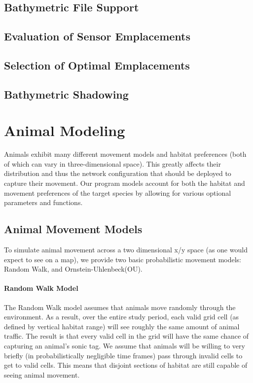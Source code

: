 \subsection{Bathymetric File Support}
\subsection{Evaluation of Sensor Emplacements}
\subsection{Selection of Optimal Emplacements}

\subsection{Bathymetric Shadowing}



\section{Animal Modeling}
Animals exhibit many different movement models and habitat preferences (both of which can vary in three-dimensional space).  This greatly affects their distribution and thus the network configuration that should be deployed to capture their movement.  Our program models account for both the habitat and movement preferences of the target species by allowing for various optional parameters and functions.

\subsection{Animal Movement Models}
 To simulate animal movement across a two dimensional x/y space (as one would expect to see on a map), we provide two basic probabilistic movement models: Random Walk, and Ornstein-Uhlenbeck(OU).  

\paragraph{Random Walk Model}
The Random Walk model assumes that animals move randomly through the environment.  As a result, over the entire study period, each valid grid cell (as defined by vertical habitat range) will see roughly the same amount of animal traffic.  The result is that every valid cell  in the grid will have the same chance of capturing an animal's sonic tag.  We assume that animals will be willing to very briefly (in probabilistically negligible time frames) pass through invalid cells to get to valid cells.  This means that disjoint sections of habitat are still capable of seeing animal movement.

